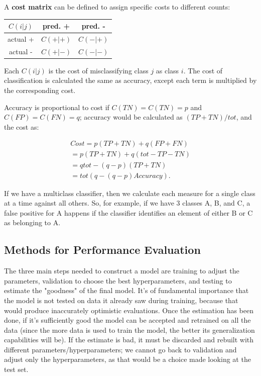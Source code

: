A \textbf{cost matrix} can be defined to assign specific costs to different counts:
\begin{table}[h]
    \centering
    \begin{tabular}{|c|c|c|}
         \hline
        $C(i|j)$ & pred. + & pred. - \\
        \hline
        actual + & $C(+|+)$ & $C(-|+)$\\
        \hline
        actual - & $C(+|-)$ & $C(-|-)$\\
        \hline
    \end{tabular}
\end{table}
Each $C(i|j)$ is the cost of misclassifying class $j$ as class $i$. The cost of classification is calculated the same as accuracy, except each term is multiplied by the corresponding cost.

Accuracy is proportional to cost if $C(TN) = C(TN) = p$ and $C(FP) = C(FN) = q$; accuracy would be calculated as $(TP + TN)/tot$, and the cost as:

\begin{align*}
    \textit{Cost} = p(\textit{TP} + \textit{TN}) + q(\textit{FP} + \textit{FN}) \\
    = p(\textit{TP} + \textit{TN}) + q(\textit{tot} - \textit{TP} - \textit{TN}) \\
    = q\textit{tot} - (q - p)(\textit{TP} + \textit{TN}) \\
    = \textit{tot}(q - (q-p)\textit{Accuracy}).
\end{align*}

If we have a multiclass classifier, then we calculate each measure for a single class at a time against all others. So, for example, if we have 3 classes A, B, and C, a false positive for A happens if the classifier identifies an element of either B or C as belonging to A.

\subsection{Methods for Performance Evaluation}

The three main steps needed to construct a model are training to adjust the parameters, validation to choose the best hyperparameters, and testing to estimate the "goodness" of the final model. It's of fundamental importance that the model is not tested on data it already saw during training, because that would produce inaccurately optimistic evaluations. Once the estimation has been done, if it's sufficiently good the model can be accepted and retrained on all the data (since the more data is used to train the model, the better its generalization capabilities will be). If the estimate is bad, it must be discarded and rebuilt with different parameters/hyperparameters; we cannot go back to validation and adjust only the hyperparameters, as that would be a choice made looking at the test set.


